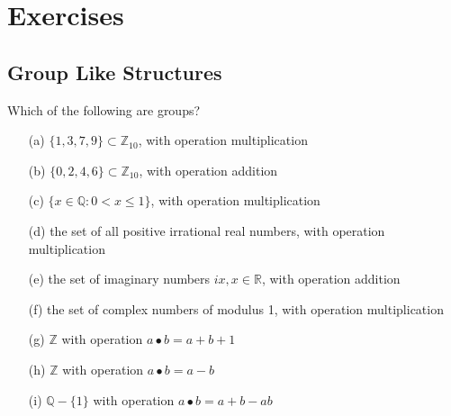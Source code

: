 \section{Exercises} 

\subsection{Group Like Structures}

  \begin{exercise}[Shifrin 6.1.1]
    Which of the following are groups?
    \begin{enumerate}
      \item[(a)] $\{1,3,7,9\} \subset \mathbb{Z}_{10}$, with operation multiplication
      \item[(b)] $\{0,2,4,6\} \subset \mathbb{Z}_{10}$, with operation addition
      \item[(c)] $\{x \in \mathbb{Q} : 0 < x \leq 1\}$, with operation multiplication
      \item[(d)] the set of all positive irrational real numbers, with operation multiplication
      \item[(e)] the set of imaginary numbers $ix, x \in \mathbb{R}$, with operation addition
      \item[(f)] the set of complex numbers of modulus 1, with operation multiplication
      \item[(g)] $\mathbb{Z}$ with operation $a \bullet b = a + b + 1$
      \item[(h)] $\mathbb{Z}$ with operation $a \bullet b = a - b$
      \item[(i)] $\mathbb{Q} - \{1\}$ with operation $a \bullet b = a + b - ab$
    \end{enumerate}
  \end{exercise}
